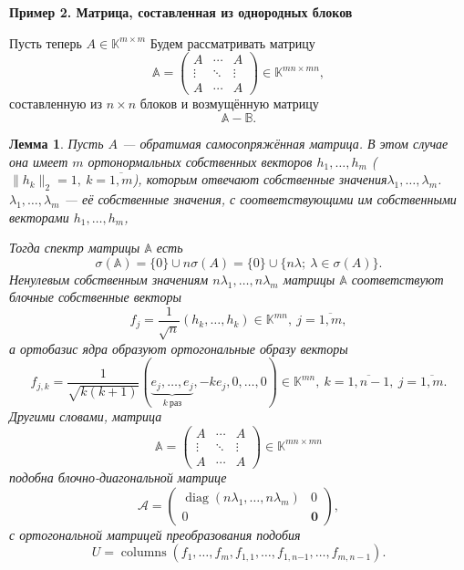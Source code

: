 \documentclass[12pt]{article}
\newtheorem{ksvlem}[ksvthm]{Лемма}
\theoremstyle{definition}
\begin{document}
\smallskip\textbf{Пример 2. Матрица, составленная из однородных блоков}\smallskip

Пусть теперь \( A\in \mathbb{K}^{m\times m} \)
Будем рассматривать матрицу
\[
    \mathbb{A} =
    \begin{pmatrix}
        A      & \cdots & A \\
        \vdots & \ddots & \vdots \\
        A      & \cdots & A
    \end{pmatrix}
    \in \mathbb{K}^{mn{\times}mn},
    \]
    составленную из \( n\times n \) блоков
    и возмущённую матрицу
\[
    \mathbb{A} - \mathbb{B}.
    \]

\begin{ksvlem}
    Пусть \( A \) --- обратимая самосопряжённая матрица.
    В этом случае она имеет \( m \) ортонормальных
    собственных векторов \( h_1, \ldots, h_m \)
    (\( \|h_k\|_2=1,\ k{=}\overline{1,m} \)),
    которым отвечают собственные значения\( \lambda_1, \ldots, \lambda_m \).
    \( \lambda_1, \ldots, \lambda_m \)
    --- её собственные значения,
    с соответствующими им собственными векторами
    \( h_1, \ldots, h_m \),

    Тогда спектр матрицы \( \mathbb{A} \) есть
    \[
        \sigma(\mathbb{A}) = \{0\} \cup n\sigma(A)
        = \{ 0 \} \cup \{ n\lambda;\ \lambda\in\sigma(A) \}.
        \]
    Ненулевым собственным значениям \( n\lambda_1, \ldots, n\lambda_m \)
    матрицы \( \mathbb{A} \)
    соответствуют блочные собственные векторы
    \[
        f_j = \frac{1}{\sqrt{n}}(h_k, \ldots, h_k)\in\mathbb{K}^{mn},
        \ j{=}\overline{1,m},
       \]
    а ортобазис ядра образуют ортогональные образу
    векторы
    \[
        f_{j,k} =
        \frac{1}{\sqrt{k(k+1)}}
        (\underbrace{e_j,\ldots,e_j}_{k\ \text{раз}}, -ke_j, 0, \ldots, 0)\in\mathbb{K}^{mn},
        \ k{=}\overline{1,n-1},
        \ j{=}\overline{1,m}.
        \]
    Другими словами, матрица
    \[
        \mathbb{A} =
        \begin{pmatrix}
            A      & \cdots & A \\
            \vdots & \ddots & \vdots \\
            A      & \cdots & A
        \end{pmatrix}
        \in\mathbb{K}^{mn{\times}mn}
        \]
    подобна блочно-диагональной матрице
    \[
        \mathcal{A} =
        \left(\begin{array}{c|c}
            \operatorname{diag}(n\lambda_1,\ldots,n\lambda_m) & 0 \\ \hline
            0 & \mathbf{0}
        \end{array}\right),
        \]
    с ортогональной матрицей преобразования подобия
    \[
        U = \operatorname{columns}
        \left(f_1, \ldots, f_m, f_{1,1}, \ldots, f_{1,n{-1}}, \ldots, f_{m,n{-}1}\right).
        \]
\end{ksvlem}
\end{document}
